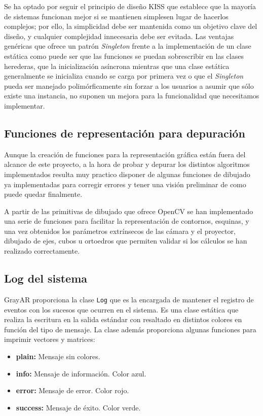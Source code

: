 Se ha optado por seguir el principio de diseño \acs{KISS} que establece que la mayoría de sistemas funcionan mejor si se mantienen simplesen lugar de hacerlos complejos; por ello, la simplicidad debe ser mantenida como un objetivo clave del diseño, y cualquier complejidad innecesaria debe ser evitada. Las ventajas genéricas que ofrece un patrón \textit{Singleton} frente a la implementación de un clase estática como puede ser que las funciones se puedan sobrescribir en las clases herederas, que la inicialización asíncrona mientras que una clase estática generalmente se inicializa cuando se carga por primera vez o que el \textit{Singleton} pueda ser manejado polimórficamente sin forzar a los usuarios a asumir que sólo existe una instancia, no suponen un mejora para la funcionalidad que necesitamos implementar. 

\subsection{Funciones de representación para depuración}
Aunque la creación de funciones para la representación gráfica están fuera del alcance de este proyecto, a la hora de probar y depurar los distintos algoritmos implementados resulta muy practico disponer de algunas funciones de dibujado ya implementadas para corregir errores y tener una visión preliminar de como puede quedar finalmente.

A partir de las primitivas de dibujado que ofrece OpenCV se han implementado una serie de funciones para facilitar la representación de contornos, esquinas, y una vez obtenidos los parámetros extrínsecos de las cámara y el proyector, dibujado de ejes, cubos u ortoedros que permiten validar si los cálculos se han realizado correctamente.

\subsection{Log del sistema}
GrayAR proporciona la clase \texttt{Log} que es la encargada de mantener el registro de eventos con los sucesos que ocurren en el sistema. Es una clase estática que realiza la escritura en la salida estándar con resaltado en distintos colores en función del tipo de mensaje. La clase además proporciona algunas funciones para imprimir vectores y matrices:
\begin{itemize}
\item \textbf{plain:} Mensaje sin colores.
\item \textbf{info:}  Mensaje de información. Color azul.
\item \textbf{error:} Mensaje de error. Color rojo.
\item \textbf{success:} Mensaje de éxito. Color verde.
\end{itemize}

